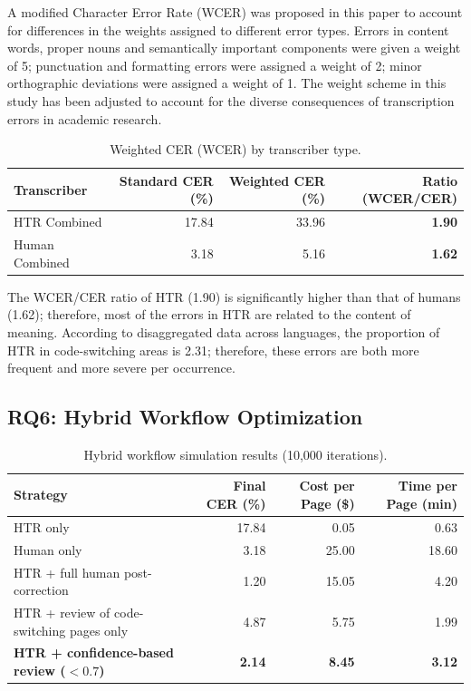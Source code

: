 \documentclass[final]{anthology-ch} %
\begin{document}
A modified Character Error Rate (WCER) was proposed in this paper to account for differences in the weights assigned to different error types. Errors in content words, proper nouns and semantically important components were given a weight of 5; punctuation and formatting errors were assigned a weight of 2; minor orthographic deviations were assigned a weight of 1. The weight scheme in this study has been adjusted to account for the diverse consequences of transcription errors in academic research.

\begin{table}[h]
  \centering
  \small
  \begin{tabular}{lrrr}
    \toprule
    Transcriber & Standard CER (\%) & Weighted CER (\%) & Ratio (WCER/CER) \\
    \midrule
    HTR Combined   & 17.84 & 33.96 & \textbf{1.90} \\
    Human Combined & 3.18  & 5.16  & \textbf{1.62} \\
    \bottomrule
  \end{tabular}
  \caption{Weighted CER (WCER) by transcriber type.}
  \label{tab:wcer}
\end{table}

The WCER/CER ratio of HTR (1.90) is significantly higher than that of humans (1.62); therefore, most of the errors in HTR are related to the content of meaning. According to disaggregated data across languages, the proportion of HTR in code-switching areas is 2.31; therefore, these errors are both more frequent and more severe per occurrence.

\subsection{RQ6: Hybrid Workflow Optimization}

\begin{table}[h]
  \centering
  \small
  \begin{tabular}{lrrr}
    \toprule
    Strategy & Final CER (\%) & Cost per Page (\$) & Time per Page (min) \\
    \midrule
    HTR only                                   & 17.84 & 0.05  & 0.63 \\
    Human only                                 & 3.18  & 25.00 & 18.60 \\
    HTR + full human post-correction           & 1.20  & 15.05 & 4.20 \\
    HTR + review of code-switching pages only  & 4.87  & 5.75  & 1.99 \\
    \textbf{HTR + confidence-based review ($<0.7$)} & \textbf{2.14} & \textbf{8.45} & \textbf{3.12} \\
    \bottomrule
  \end{tabular}
  \caption{Hybrid workflow simulation results (10,000 iterations).}
  \label{tab:hybrid}
\end{table}
\end{document}
